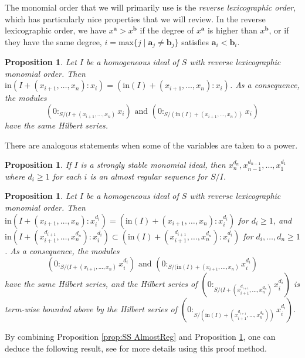 \documentclass[a4paper, 10pt, reqno, english, ones]{amsart}  %
\newtheorem{proposition}[theorem]{Proposition}
\theoremstyle{definition}
\theoremstyle{remark}
\begin{document}
The monomial order that we will primarily use is the \textit{reverse lexicographic order}, which has particularly nice properties that we will review. In the reverse lexicographic order, we have $x^\mathbf{a} > x^\mathbf{b}$ if the degree of $x^\mathbf{a}$ is higher than $x^\mathbf{b}$, or if they have the same degree, $i=\textrm{max}\{j \mid \mathbf{a}_j \neq \mathbf{b}_j\}$ satisfies $\mathbf{a}_i<\mathbf{b}_i$.

\begin{proposition}\label{prop:In Hilbert}
    Let $I$ be a homogeneous ideal of $S$ with reverse lexicographic monomial order. Then $\textrm{in}(I+(x_{i+1},\dots,x_n):x_i) = (\textrm{in}(I) + (x_{i+1},\dots,x_n):x_i)$. As a consequence, the modules
    \[
    (0:_{S/(I+(x_{i+1},\dots,x_n)} x_i) \textrm{ and } (0:_{S/(\textrm{in}(I)+(x_{i+1},\dots,x_n))} x_i)
    \]
    have the same Hilbert series.
\end{proposition}

\noindent There are analogous statements when some of the variables are taken to a power.

\begin{proposition}\label{prop:SS Pow AlmostReg}
    If $I$ is a strongly stable monomial ideal, then $x_n^{d_n},x_{n-1}^{d_{n-1}},\dots,x_1^{d_1}$ where $d_i\geq 1$ for each $i$ is an almost regular sequence for $S/I$.
\end{proposition}

\begin{proposition}\label{prop:Pow In Hilbert}
    Let $I$ be a homogeneous ideal of $S$ with reverse lexicographic monomial order. Then $\textrm{in}(I+(x_{i+1},\dots,x_n):x_i^{d_i}) = (\textrm{in}(I) + (x_{i+1},\dots,x_n):x_i^{d_i})$ for $d_i \geq 1$, and $\textrm{in}(I+(x_{i+1}^{d_{i+1}},\dots,x_n^{d_n}):x_i^{d_i}) \subset (\textrm{in}(I) + (x_{i+1}^{d_{i+1}},\dots,x_n^{d_n}):x_i^{d_i})$ for $d_i,\dots,d_n\geq 1$. As a consequence, the modules
    \[
    (0:_{S/(I+(x_{i+1},\dots,x_n)} x_i^{d_i}) \textrm{ and } (0:_{S/(\textrm{in}(I)+(x_{i+1},\dots,x_n)} x_i^{d_i})
    \]
    have the same Hilbert series, and the Hilbert series of $(0:_{S/(I+(x_{i+1}^{d_{i+1}},\dots,x_n^{d_n})} x_i^{d_i})$ is term-wise bounded above by the Hilbert series of $(0:_{S/(\textrm{in}(I)+(x_{i+1}^{d_{i+1}},\dots,x_n^{d_n}))} x_i^{d_i})$.
\end{proposition}

By combining Proposition \ref{prop:SS AlmostReg} and Proposition \ref{prop:In Hilbert}, one can deduce the following result, see \cite{aramova2000Almost} for more details using this proof method.
\end{document}
